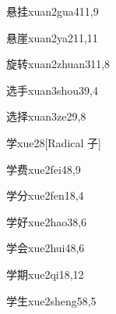 \begin{verbete}{悬挂}{xuan2gua4}{11,9}
\end{verbete}

\begin{verbete}{悬崖}{xuan2ya2}{11,11}
\end{verbete}

\begin{verbete}{旋转}{xuan2zhuan3}{11,8}
\end{verbete}

\begin{verbete}{选手}{xuan3shou3}{9,4}
\end{verbete}

\begin{verbete}{选择}{xuan3ze2}{9,8}
\end{verbete}

\begin{verbete}{学}{xue2}{8}[Radical 子]
\end{verbete}

\begin{verbete}{学费}{xue2fei4}{8,9}
\end{verbete}

\begin{verbete}{学分}{xue2fen1}{8,4}
\end{verbete}

\begin{verbete}{学好}{xue2hao3}{8,6}
\end{verbete}

\begin{verbete}{学会}{xue2hui4}{8,6}
\end{verbete}

\begin{verbete}{学期}{xue2qi1}{8,12}
\end{verbete}

\begin{verbete}{学生}{xue2sheng5}{8,5}
\end{verbete}

